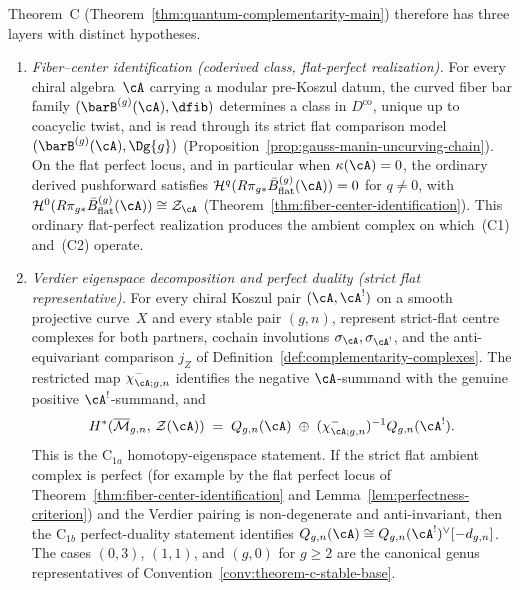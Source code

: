 Theorem~C (Theorem~\ref{thm:quantum-complementarity-main})
therefore has three layers with distinct hypotheses.
\begin{enumerate}[label=\textup{(C\arabic*)},start=0]
\item \emph{Fiber--center identification
 \textup{(}coderived class, flat-perfect realization\textup{)}.}\;
 For every chiral algebra~$\cA$ carrying a modular pre-Koszul datum,
 the curved fiber bar family
 $(\barB^{(g)}(\cA),\dfib)$ determines a class in
 $D^{\mathrm{co}}$, unique up to coacyclic twist, and is read through
 its strict flat comparison model
 $(\barB^{(g)}(\cA),\Dg{g})$
 \textup{(}Proposition~\textup{\ref{prop:gauss-manin-uncurving-chain}}\textup{)}.
 On the flat perfect locus, and in particular when
 $\kappa(\cA)=0$, the ordinary derived pushforward satisfies
 $\mathcal{H}^q(R\pi_{g*}\bar{B}^{(g)}_{\mathrm{flat}}(\cA)) = 0$
 for $q \neq 0$, with
 $\mathcal{H}^0(R\pi_{g*}\bar{B}^{(g)}_{\mathrm{flat}}(\cA))
 \cong \mathcal{Z}_{\cA}$
 \textup{(}Theorem~\textup{\ref{thm:fiber-center-identification})}.
 This ordinary flat-perfect realization produces the ambient complex
 on which~\textup{(C1)} and~\textup{(C2)} operate.

\item \emph{Verdier eigenspace decomposition and perfect duality
\textup{(}strict flat representative\textup{)}.}\;
 For every chiral Koszul pair $(\cA, \cA^!)$ on a smooth projective
 curve~$X$ and every stable pair \((g,n)\), represent strict-flat
 centre complexes for both partners, cochain involutions
 \(\sigma_{\cA},\sigma_{\cA^!}\), and the anti-equivariant comparison
 \(j_Z\) of Definition~\ref{def:complementarity-complexes}.  The
 restricted map \(\chi^-_{\cA;g,n}\) identifies the negative
 \(\cA\)-summand with the genuine positive \(\cA^!\)-summand, and
 \begin{equation}\label{eq:complementarity-summary}
 H^*(\overline{\mathcal{M}}_{g,n},\,\mathcal{Z}(\cA))
 \;=\;
 Q_{g,n}(\cA) \;\oplus\;
 (\chi^-_{\cA;g,n})^{-1}Q_{g,n}(\cA^!).
 \end{equation}
 This is the $\mathrm{C}_{1a}$ homotopy-eigenspace statement. If the
 strict flat ambient complex is perfect
 \textup{(}for example by the flat perfect locus of
 Theorem~\ref{thm:fiber-center-identification} and
 Lemma~\ref{lem:perfectness-criterion}\textup{)} and the Verdier
 pairing is non-degenerate and anti-invariant, then the
 $\mathrm{C}_{1b}$ perfect-duality statement identifies
 $Q_{g,n}(\cA) \cong Q_{g,n}(\cA^!)^\vee[-d_{g,n}]$.
 The cases \((0,3)\), \((1,1)\), and \((g,0)\) for \(g\geq2\)
 are the canonical genus representatives of
 Convention~\ref{conv:theorem-c-stable-base}.


\end{enumerate}
